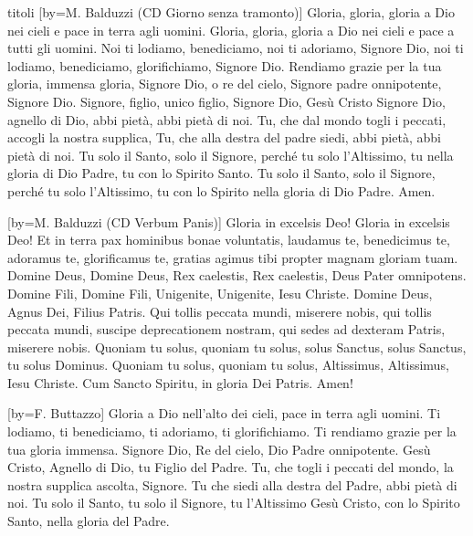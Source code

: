 \begin{songs}{titoli}
[by={M. Balduzzi (CD Giorno senza tramonto)}]
\beginchorus
Gloria, gloria, gloria a Dio nei cieli e pace in terra agli uomini.
Gloria, gloria, gloria a Dio nei cieli e pace a tutti gli uomini.
\endchorus
\beginverse
Noi ti lodiamo, benediciamo, noi ti adoriamo, Signore Dio,
noi ti lodiamo, benediciamo, glorifichiamo, Signore Dio.
Rendiamo grazie per la tua gloria, immensa gloria, Signore Dio,
o re del cielo, Signore padre onnipotente, Signore Dio.
\endverse
\beginverse
Signore, figlio, unico figlio, Signore Dio, Gesù Cristo
Signore Dio, agnello di Dio, abbi pietà, abbi pietà di noi.
Tu, che dal mondo togli i peccati, accogli la nostra supplica,
Tu, che alla destra del padre siedi, abbi pietà, abbi pietà di noi.
\endverse
\beginverse
Tu solo il Santo, solo il Signore,
perché tu solo l'Altissimo,
tu nella gloria di Dio Padre,
tu con lo Spirito Santo.
Tu solo il Santo, solo il Signore,
perché tu solo l'Altissimo,
tu con lo Spirito nella gloria
di Dio Padre. Amen.
\endverse
\endsong

[by={M. Balduzzi (CD Verbum Panis)}]
\beginchorus
Gloria in excelsis Deo! Gloria in excelsis Deo! 
\endchorus
\beginverse
Et in terra pax hominibus bonae voluntatis,
laudamus te, benedicimus te,
adoramus te, glorificamus te,
gratias agimus tibi
propter magnam gloriam tuam.
\endverse
\beginverse
Domine Deus, Domine Deus,
Rex caelestis, Rex caelestis,
Deus Pater omnipotens.
Domine Fili, Domine Fili,
Unigenite, Unigenite,
Iesu Christe.
Domine Deus, Agnus Dei, Filius Patris.
\endverse
\beginverse
Qui tollis peccata mundi, miserere nobis,
qui tollis peccata mundi,
suscipe deprecationem nostram,
qui sedes ad dexteram Patris,
miserere nobis.
\endverse
\beginverse
Quoniam tu solus, quoniam tu solus,
solus Sanctus, solus Sanctus,
tu solus Dominus.
Quoniam tu solus, quoniam tu solus,
Altissimus, Altissimus,
Iesu Christe.
Cum Sancto Spiritu, in gloria Dei Patris.
\endverse
\beginverse*
Amen!
\endverse
\endsong

[by={F. Buttazzo}]
\beginchorus
Gloria a Dio nell'alto dei cieli,
pace in terra agli uomini. 
\endchorus
\beginverse
Ti lodiamo, ti benediciamo,
ti adoriamo, ti glorifichiamo.
Ti rendiamo grazie
per la tua gloria immensa.
Signore Dio, Re del cielo,
Dio Padre onnipotente.
Gesù Cristo, Agnello di Dio,
tu Figlio del Padre.
\endverse
\beginverse
Tu, che togli i peccati del mondo,
la nostra supplica ascolta, Signore.
Tu che siedi alla destra del Padre, abbi pietà di noi.
\endverse
\beginverse
Tu solo il Santo, tu solo il Signore, tu l'Altissimo Gesù Cristo,
con lo Spirito Santo,
nella gloria del Padre.
\endverse
\endsong


\end{songs}
